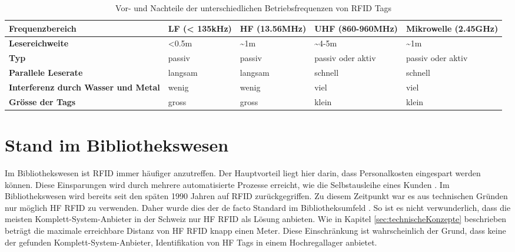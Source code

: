 \begin{table}[htb]
	\begin{tabularx}{\textwidth}{|X|X|X|X|X|}
		\hline
		\textbf{Frequenz\-bereich} & \textbf{LF (< 135kHz)} & \textbf{\gls{HF} (13.56MHz)} & \textbf{\gls{UHF} (860-960MHz)} & \textbf{Mikrowelle (2.45GHz)}\\
		\hline
		\textbf{Lesereichweite} & <0.5m & \textasciitilde 1m & \textasciitilde 4-5m & \textasciitilde 1m\\
		\hline
		\textbf{Typ} & passiv & passiv & passiv oder aktiv & passiv oder aktiv\\
		\hline
		\textbf{Parallele Leserate} & langsam & langsam & schnell & schnell \\
		\hline
		\textbf{Interferenz durch Wasser und Metal} & wenig & wenig & viel & viel \\
		\hline
		\textbf{Grösse der Tags} & gross & gross & klein & klein \\
		\hline
	\end{tabularx}
	\caption{Vor- und Nachteile der unterschiedlichen Betriebsfrequenzen von \gls{RFID} Tags \parencite{chawla2007}}
	\label{tbl:RFIDFrequencies}
\end{table}

\section{Stand im Bibliothekswesen}
Im Bibliothekswesen ist \gls{RFID} immer häufiger anzutreffen. Der Hauptvorteil liegt hier darin, dass Personalkosten eingespart werden können. Diese Einsparungen wird durch mehrere automatisierte Prozesse erreicht, wie die Selbstausleihe eines Kunden \parencite{Keller2010}.
Im Bibliothekswesen wird bereits seit den späten 1990 Jahren auf \gls{RFID} zurückgegriffen. Zu diesem Zeitpunkt war es aus technischen Gründen nur möglich \gls{HF} \gls{RFID} zu verwenden. Daher wurde dies der de facto Standard im Bibliotheksumfeld \parencite{rfidHfVsUhf}. So ist es nicht verwunderlich, dass die meisten Komplett-System-Anbieter in der Schweiz nur \gls{HF} \gls{RFID} als Lösung anbieten. Wie in Kapitel \ref{sec:technischeKonzepte} beschrieben beträgt die maximale erreichbare Distanz von \gls{HF} \gls{RFID} knapp einen Meter. Diese Einschränkung ist wahrscheinlich der Grund, dass keine der gefunden Komplett-System-Anbieter, Identifikation von \gls{HF} Tags in einem Hochregallager anbietet.

